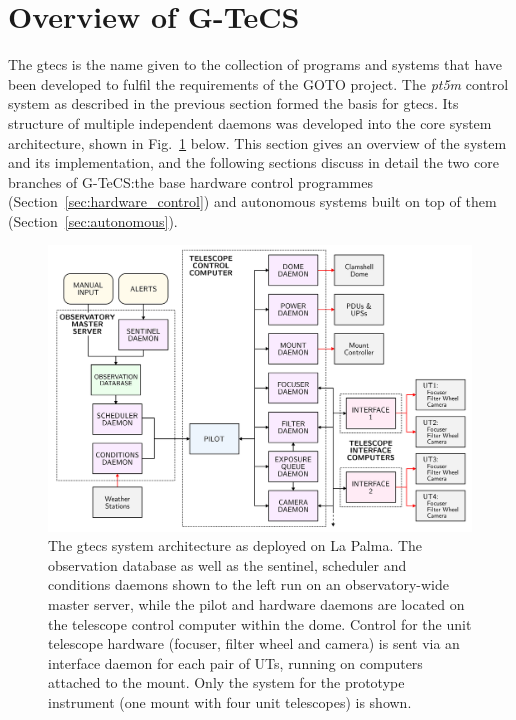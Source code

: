 \section{Overview of G-TeCS}
\label{sec:gtecs}
\begin{colsection}


\begin{colsection}

The \gls{gtecs} is the name given to the collection of programs and systems that have been developed to fulfil the requirements of the GOTO project. The \textit{pt5m} control system as described in the previous section formed the basis for \gls{gtecs}. Its structure of multiple independent daemons was developed into the core system architecture, shown in Fig.~\ref{fig:flow} below. This section gives an overview of the system and its implementation, and the following sections discuss in detail the two core branches of G-TeCS:\@ the base hardware control programmes (Section~\ref{sec:hardware_control}) and autonomous systems built on top of them (Section~\ref{sec:autonomous}).

\begin{figure}[h]
\begin{center}
\includegraphics[width=\linewidth]{images/flow.pdf}
\end{center}
\caption[The G-TeCS system architecture]{The \gls{gtecs} system architecture as deployed on La Palma. The observation database as well as the sentinel, scheduler and conditions daemons shown to the left run on an observatory-wide master server, while the pilot and hardware daemons are located on the telescope control computer within the dome. Control for the unit telescope hardware (focuser, filter wheel and camera) is sent via an interface daemon for each pair of UTs, running on computers attached to the mount. Only the system for the prototype instrument (one mount with four unit telescopes) is shown.}
\label{fig:flow}
\end{figure}


\end{colsection}
\end{colsection}
